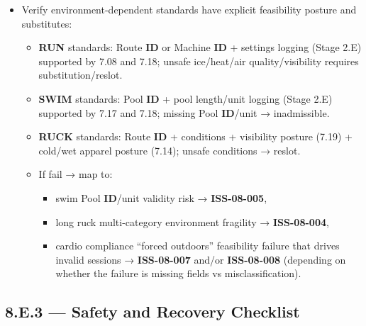 \documentclass[10pt]{article}
\begin{document}
\begin{itemize}
\item Verify environment-dependent standards have explicit feasibility posture and substitutes:
  \begin{itemize}
  \item \textbf{RUN} standards: Route \textbf{ID} or Machine \textbf{ID} + settings logging (Stage 2.E) supported by 7.08 and 7.18; unsafe ice/heat/air quality/visibility requires substitution/reslot.
  \item \textbf{SWIM} standards: Pool \textbf{ID} + pool length/unit logging (Stage 2.E) supported by 7.17 and 7.18; missing Pool \textbf{ID}/unit → inadmissible.
  \item \textbf{RUCK} standards: Route \textbf{ID} + conditions + visibility posture (7.19) + cold/wet apparel posture (7.14); unsafe conditions → reslot.
  \item If fail → map to:
    \begin{itemize}
    \item swim Pool \textbf{ID}/unit validity risk → \textbf{ISS-08-005},
    \item long ruck multi-category environment fragility → \textbf{ISS-08-004},
    \item cardio compliance “forced outdoors” feasibility failure that drives invalid sessions → \textbf{ISS-08-007} and/or \textbf{ISS-08-008} (depending on whether the failure is missing fields vs misclassification).
    \end{itemize}
  \end{itemize}
\end{itemize}

\subsection*{8.E.3 — Safety and Recovery Checklist}
{}
\end{document}
